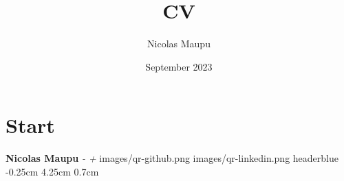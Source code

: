 \documentclass[darkhipster]{hipstercv}
\title{CV}
\author{Nicolas Maupu}
\date{September 2023}
\begin{document}
\section*{Start}

%
%

%
%
\FPsub\result{\thedatetwo}{\thedateone}
\FPsub\result{\thedatetwo}{\thedateone}
\FPdiv{}
\myage

\header
  {\color{headerbluefont} \huge \bfseries Nicolas Maupu}
  {\color{headerbluefont} \emph{\large \langHeaderJobTitle}}
  {\color{headerbluefont} \emph{{\bfseries \langFreelance} - \FPround{}\myage+ \langHeaderExperience}}
  {images/qr-github.png}
  {images/qr-linkedin.png}
  {headerblue}
  {-0.25cm} %
  {4.25cm} %
  {0.7cm} %



\subsection*{}
\end{document}
